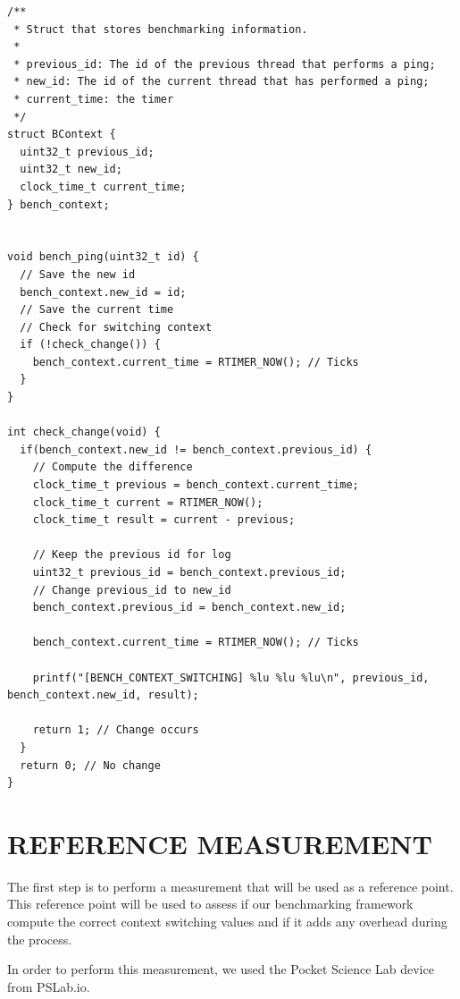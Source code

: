 \documentclass[a4paper, 10pt, conference]{ieeeconf}      %
\begin{document}
\begin{lstlisting}[style=CStyle, label={lst:code}, caption={Source code of the benchmarking framework implemented in Contiki}]
/**
 * Struct that stores benchmarking information.
 * 
 * previous_id: The id of the previous thread that performs a ping;
 * new_id: The id of the current thread that has performed a ping;
 * current_time: the timer
 */
struct BContext {
  uint32_t previous_id;
  uint32_t new_id;
  clock_time_t current_time;
} bench_context;


void bench_ping(uint32_t id) {
  // Save the new id
  bench_context.new_id = id;
  // Save the current time
  // Check for switching context
  if (!check_change()) {
    bench_context.current_time = RTIMER_NOW(); // Ticks
  }
}

int check_change(void) {
  if(bench_context.new_id != bench_context.previous_id) {
    // Compute the difference
    clock_time_t previous = bench_context.current_time;
    clock_time_t current = RTIMER_NOW();
    clock_time_t result = current - previous;

    // Keep the previous id for log
    uint32_t previous_id = bench_context.previous_id;
    // Change previous_id to new_id
    bench_context.previous_id = bench_context.new_id;

    bench_context.current_time = RTIMER_NOW(); // Ticks

    printf("[BENCH_CONTEXT_SWITCHING] %lu %lu %lu\n", previous_id, bench_context.new_id, result);
    
    return 1; // Change occurs
  }
  return 0; // No change
}
\end{lstlisting}

\section{\label{sec:ref}REFERENCE MEASUREMENT}
The first step is to perform a measurement that will be used as a reference point.
This reference point will be used to assess if our benchmarking framework compute the correct context switching values and if it adds any overhead during the process.

In order to perform this measurement, we used the Pocket Science Lab device from PSLab.io.
\end{document}
